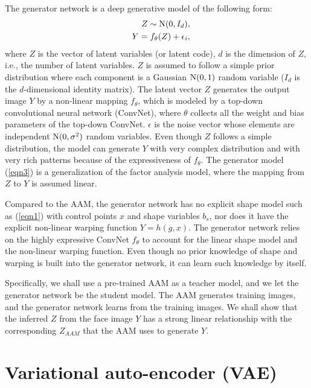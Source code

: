 \documentclass{article}
\begin{document}
The generator network is a deep generative model of the following form:
\begin{eqnarray}
\label{eqn3}
&&Z \sim {\rm N}(0, I_d), \\
 && Y = f_\theta(Z) + \epsilon_i,
\end{eqnarray}
where $Z$ is the vector of latent variables (or latent code), $d$ is the dimension of $Z$, i.e., the number of latent variables. $Z$ is assumed to follow a simple prior distribution where each component is a Gaussian ${\rm N}(0, 1)$ random variable ($I_d$ is the $d$-dimensional identity matrix). The latent vector $Z$ generates the output image $Y$ by a non-linear mapping $f_\theta$, which is modeled by a top-down convolutional neural network (ConvNet), where $\theta$ collects all the weight and bias parameters of the top-down ConvNet. $\epsilon$ is the noise vector whose elements are independent ${\rm N}(0, \sigma^2)$ random variables. Even though $Z$ follows a simple distribution, the model can generate $Y$ with very complex distribution and with very rich patterns because of the expressiveness of $f_\theta$. The generator model (\ref{eqn3}) is a generalization of the factor analysis model, where the mapping from $Z$ to $Y$ is assumed linear.

Compared to the AAM, the generator network has no explicit shape model such as (\ref{eqn1}) with control points $x$ and shape variables $b_s$, nor does it have the explicit non-linear  warping function $Y = h(g, x)$. The generator network relies on the highly expressive ConvNet $f_\theta$ to account for the linear shape model and the non-linear warping function. Even though no prior knowledge of shape and warping is built into the generator network, it can learn such knowledge by itself.

Specifically, we shall use a pre-trained AAM as a teacher model, and we let the generator network be the student model. The AAM generates training images, and the generator network learns from the training images. We shall show that the inferred $Z$ from the face image $Y$ has a strong linear relationship with the corresponding $Z_{AAM}$ that the AAM uses to generate $Y$.

\section{Variational auto-encoder (VAE)}
\end{document}
